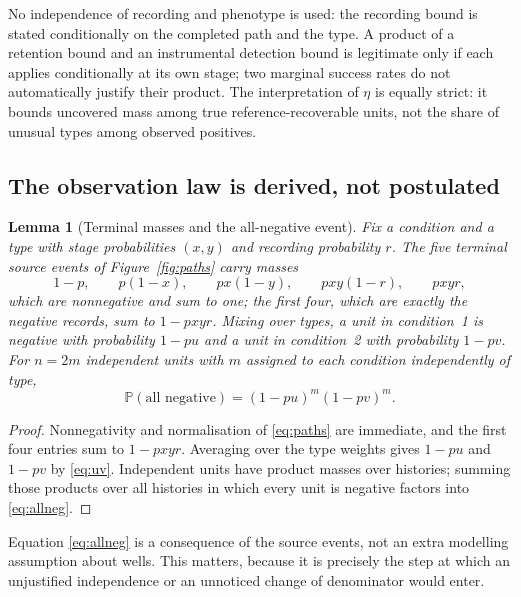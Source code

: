 \documentclass[11pt]{article}
\newtheorem{lemma}[theorem]{Lemma}
\theoremstyle{definition}
\theoremstyle{remark}
\newcommand{\Prob}{\mathbb{P}}
\begin{document}
No independence of recording and phenotype is used: the recording bound is
stated conditionally on the completed path and the type. A product of a
retention bound and an instrumental detection bound is legitimate only if each
applies conditionally at its own stage; two marginal success rates do not
automatically justify their product. The interpretation of $\eta$ is equally
strict: it bounds uncovered mass among true reference-recoverable units, not the
share of unusual types among observed positives.

\subsection{The observation law is derived, not postulated}

\begin{lemma}[Terminal masses and the all-negative event]\label{lem:likelihood}
Fix a condition and a type with stage probabilities $(x,y)$ and recording
probability $r$. The five terminal source events of Figure~\ref{fig:paths} carry
masses
\begin{equation}\label{eq:paths}
1-p,\qquad p(1-x),\qquad px(1-y),\qquad pxy(1-r),\qquad pxyr,
\end{equation}
which are nonnegative and sum to one; the first four, which are exactly the
negative records, sum to $1-pxyr$. Mixing over types, a unit in condition~1 is
negative with probability $1-pu$ and a unit in condition~2 with probability
$1-pv$. For $n=2m$ independent units with $m$ assigned to each condition
independently of type,
\begin{equation}\label{eq:allneg}
\Prob(\text{all negative})=(1-pu)^m(1-pv)^m .
\end{equation}
\end{lemma}

\begin{proof}
Nonnegativity and normalisation of \eqref{eq:paths} are immediate, and the first
four entries sum to $1-pxyr$. Averaging over the type weights gives $1-pu$ and
$1-pv$ by \eqref{eq:uv}. Independent units have product masses over histories;
summing those products over all histories in which every unit is negative
factors into \eqref{eq:allneg}.
\end{proof}

Equation \eqref{eq:allneg} is a consequence of the source events, not an extra
modelling assumption about wells. This matters, because it is precisely the step
at which an unjustified independence or an unnoticed change of denominator would
enter.
\end{document}
